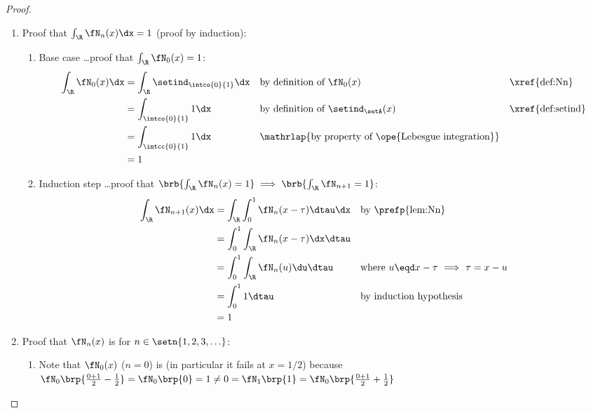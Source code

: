 \begin{proof}
\begin{enumerate}
  \item Proof that $\int_\R\fN_n(x)\dx=1$ (proof by induction): 
    \begin{enumerate}
      \item Base case \ldots proof that $\int_\R\fN_0(x)=1$: 
        \begin{align*}
          \int_\R\fN_0(x)\dx
            &= \int_\R\setind_\intco{0}{1}\dx
            && \text{by definition of $\fN_0(x)$}
            && \text{\xref{def:Nn}}
          \\&= \int_\intco{0}{1}1\dx
            && \text{by definition of $\setind_\setA(x)$}
            && \text{\xref{def:setind}}
          \\&= \int_\intcc{0}{1}1\dx
            && \mathrlap{\text{by property of \ope{Lebesgue integration}}}
          \\&= 1
        \end{align*}
      \item Induction step \ldots proof that $\brb{\int_\R\fN_n(x)=1}\implies\brb{\int_\R\fN_{n+1}=1}$:
        \begin{align*}
          \int_\R\fN_{n+1}(x)\dx
            &= \int_\R\int_0^1\fN_n(x-\tau)\dtau\dx
            && \text{by \prefp{lem:Nn}}
          \\&= \int_0^1\int_\R\fN_n(x-\tau)\dx\dtau
          \\&= \int_0^1\int_\R\fN_n(u)\du\dtau
            && \text{where $u\eqd x-\tau$ $\implies$ $\tau=x-u$}
          \\&= \int_0^1 1 \dtau
            && \text{by induction hypothesis}
          \\&= 1
        \end{align*}
    \end{enumerate}

  \item Proof that $\fN_n(x)$ is  for $n\in\setn{1,2,3,\ldots}$:
    \begin{enumerate}
      \item Note that $\fN_0(x)$ ($n=0$) is  (in particular it fails at $x=1/2$) because
        \\\indentx $ \fN_0\brp{\frac{0+1}{2}-\frac{1}{2}}
                       = \fN_0\brp{0}
                       = 1
                       \neq 0
                       = \fN_1\brp{1}
                       = \fN_0\brp{\frac{0+1}{2}+\frac{1}{2}}
                   $
    

\end{enumerate}
\end{enumerate}
\end{proof}
